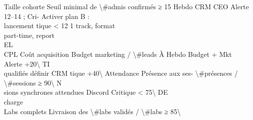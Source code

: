Taille cohorte Seuil minimal de \textbackslash{}#admis confirmés               ≥ 15    Hebdo     CRM        CEO       Alerte 12–14 ; Cri-   Activer plan B :\\
lancement                                                                              tique \textless{} 12            1 track, format\\
part-time, report\\
\vspace{0.5em}
\vspace{0.5em}
\vspace{0.5em}
\vspace{0.5em}
EL\\
CPL            Coût acquisition  Budget marketing / \textbackslash{}#leads À       Hebdo         Budget + Mkt         Alerte +20\textbackslash{}%
\vspace{0.5em}
\vspace{0.5em}
\vspace{0.5em}
\vspace{0.5em}
TI\\
qualifiés                 définir               CRM                  tique +40\textbackslash{}%
Attendance     Présence aux ses- \textbackslash{}#présences / \textbackslash{}#sessions    ≥ 90\textbackslash{}%
\vspace{0.5em}
\vspace{0.5em}
\vspace{0.5em}
\vspace{0.5em}
N\\
sions synchrones attendues                                        Discord              Critique \textless{} 75\textbackslash{}%
\vspace{0.5em}
\vspace{0.5em}
\vspace{0.5em}
\vspace{0.5em}
DE\\
charge\\
Labs complets Livraison des       \textbackslash{}#labs validés / \textbackslash{}#labs        ≥ 85\textbackslash{}%
